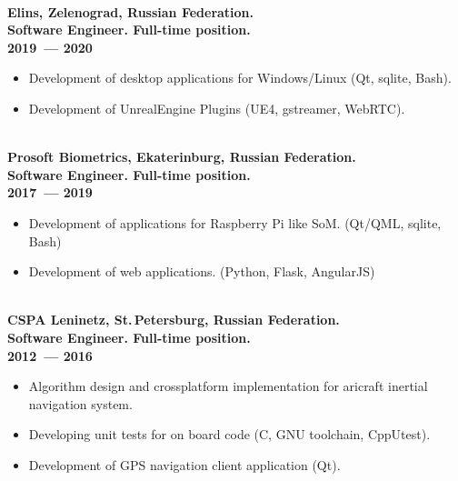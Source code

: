 \documentclass[a4paper,oneside,12pt]{article}
\begin{document}
~\\[-1em]

{\bf
Elins, Zelenograd, Russian Federation. \\
Software Engineer. Full-time position.\\
2019~--- 2020
}
\begin{itemize}
    \item Development of desktop applications for Windows/Linux (Qt, sqlite, Bash).
    \item Development of UnrealEngine Plugins (UE4, gstreamer, WebRTC).
\end{itemize}

~\\[-1em]

{\bf
Prosoft Biometrics, Ekaterinburg, Russian Federation. \\
Software Engineer. Full-time position.\\
2017~--- 2019
}
\begin{itemize}
    \item Development of applications for Raspberry Pi like SoM. (Qt/QML, sqlite, Bash)
    \item Development of web applications. (Python, Flask, AngularJS)
\end{itemize}

~\\[-1em]

{\bf
CSPA Leninetz, St.\,Petersburg, Russian Federation.\\
Software Engineer. Full-time position.\\
2012~--- 2016
}

\begin{itemize}
    \item Algorithm design and crossplatform implementation for aricraft inertial navigation system.
    \item Developing unit tests for on board code (C, GNU toolchain, CppUtest).
    \item Development of GPS navigation client application (Qt). 
\end{itemize}

~\\[-1em]
\end{document}
